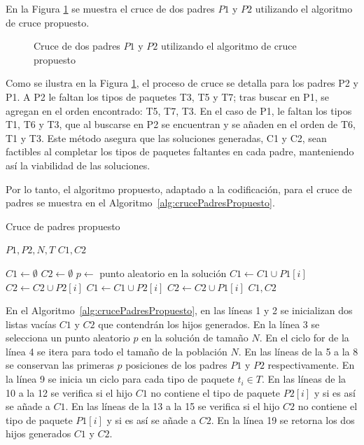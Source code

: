 \documentclass[openany]{article}
\begin{document}
En la Figura \ref{fig:cruce_propuesto} se muestra el cruce de dos padres $P1$ y $P2$ utilizando el algoritmo de cruce propuesto.

\begin{figure}[H]
    \centering
    
    \caption{Cruce de dos padres $P1$ y $P2$ utilizando el algoritmo de cruce propuesto}
    \label{fig:cruce_propuesto}
\end{figure}

Como se ilustra en la Figura \ref{fig:cruce_propuesto}, el proceso de cruce se detalla para los padres P2 y P1. A P2 le faltan los tipos de paquetes T3, T5 y T7; tras buscar en P1, se agregan en el orden encontrado: T5, T7, T3. En el caso de P1, le faltan los tipos T1, T6 y T3, que al buscarse en P2 se encuentran y se añaden en el orden de T6, T1 y T3. Este método asegura que las soluciones generadas, C1 y C2, sean factibles al completar los tipos de paquetes faltantes en cada padre, manteniendo así la viabilidad de las soluciones.

Por lo tanto, el algoritmo propuesto, adaptado a la codificación, para el cruce de padres se muestra en el Algoritmo~\ref{alg:crucePadresPropuesto}.

\begin{algorithm}[H]
    \caption{Cruce de padres propuesto}\label{alg:crucePadresPropuesto}
    \begin{algorithmic}[1]
        \Require $P1, P2, N, T$
        \Ensure $C1, C2$

        \State $C1 \leftarrow \emptyset$
        \State $C2 \leftarrow \emptyset$
        \State $p \leftarrow$ punto aleatorio en la solución
        \State $C1 \leftarrow C1 \cup P1[i]$
        \State $C2 \leftarrow C2 \cup P2[i]$
        \Else
        \State $C1 \leftarrow C1 \cup P2[i]$
        \EndIf
        \State $C2 \leftarrow C2 \cup P1[i]$
        \EndIf
        \EndFor
        \EndIf
        \EndFor
        \State \Return $C1, C2$
    \end{algorithmic}
\end{algorithm}

En el Algoritmo~\ref{alg:crucePadresPropuesto}, en las líneas 1 y 2 se inicializan dos listas vacías $C1$ y $C2$ que contendrán los hijos generados. En la línea 3 se selecciona un punto aleatorio $p$ en la solución de tamaño $N$. En el ciclo for de la línea 4 se itera para todo el tamaño de la población $N$. En las líneas de la 5 a la 8 se conservan las primeras $p$ posiciones de los padres $P1$ y $P2$ respectivamente. En la línea 9 se inicia un ciclo para cada tipo de paquete $t_i \in T$. En las líneas de la 10 a la 12 se verifica si el hijo $C1$ no contiene el tipo de paquete $P2[i]$ y si es así se añade a $C1$. En las líneas de la 13 a la 15 se verifica si el hijo $C2$ no contiene el tipo de paquete $P1[i]$ y si es así se añade a $C2$. En la línea 19 se retorna los dos hijos generados $C1$ y $C2$.
\end{document}
